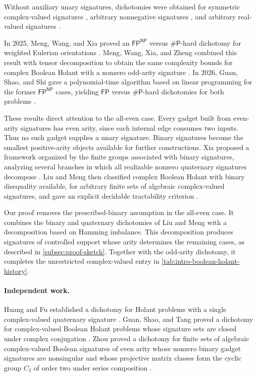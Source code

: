 \documentclass[11pt,letterpaper,onecolumn]{article}
\theoremstyle{plain}
\theoremstyle{definition}
\theoremstyle{remark}
\newcommand{\FP}{\mathsf{FP}}
\newcommand{\SharpP}{\#\mathsf P}
\begin{document}
Without auxiliary unary signatures, dichotomies were obtained for
symmetric complex-valued signatures \cite{CaiGuoWilliams2016}, arbitrary
nonnegative signatures \cite{LinWang2018}, and arbitrary real-valued
signatures \cite{ShaoCai2020}.

In 2025, Meng, Wang, and Xia proved an \(\FP^{\mathsf{NP}}\) versus
\(\SharpP\)-hard dichotomy for weighted Eulerian orientations
\cite{MengWangXia2025EO}.  Meng, Wang, Xia, and Zheng combined this result
with tensor decomposition to obtain the same complexity bounds for complex
Boolean Holant with a nonzero odd-arity signature
\cite{MengWangXiaZheng2025}.  In 2026, Guan, Shao, and Shi gave a
polynomial-time algorithm based on linear programming for the former
\(\FP^{\mathsf{NP}}\) cases, yielding \(\FP\) versus \(\SharpP\)-hard
dichotomies for both problems \cite{GuanShaoShi2026}.

These results direct attention to the all-even case.  Every gadget built
from even-arity signatures has even arity, since each internal edge consumes
two inputs.  Thus no such gadget supplies a unary signature.  Binary
signatures become the smallest positive-arity objects available for further
constructions.  Xia proposed a framework organized by the finite groups
associated with binary signatures, analyzing several branches in which all
realizable nonzero quaternary signatures decompose \cite{Xia2026Framework}.
Liu and Meng then classified complex Boolean Holant with binary
disequality available, for arbitrary finite sets of algebraic
complex-valued signatures, and gave an explicit decidable tractability
criterion \cite{Liu2026DEQ2Holant}.

Our proof removes the prescribed-binary assumption in the all-even case.
It combines the binary and quaternary dichotomies of Liu and Meng with a
decomposition based on Hamming imbalance.  This decomposition produces
signatures of controlled support whose arity determines the remaining
cases, as described in \cref{subsec:proof-sketch}.  Together with the
odd-arity dichotomy, it completes the unrestricted complex-valued entry in
\cref{tab:intro-boolean-holant-history}.

\paragraph{Independent work.}
Huang and Fu established a dichotomy for Holant problems with a single
complex-valued quaternary signature \cite{HuangFu2026FourRegular}.
Guan, Shao, and Tang proved a dichotomy for complex-valued Boolean Holant
problems whose signature sets are closed under complex conjugation
\cite{GuanShaoTang2026ConjugateClosed}.
Zhou proved a dichotomy for finite sets of algebraic complex-valued Boolean
signatures of even arity whose nonzero binary gadget signatures are
nonsingular and whose projective matrix classes form the cyclic group
\(C_2\) of order two under series composition \cite{ZhouC2Holant}.
\end{document}
